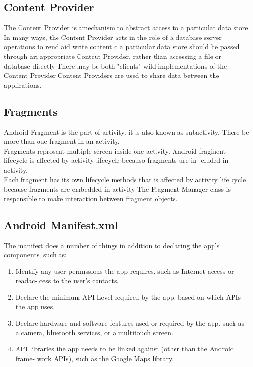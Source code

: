 \documentclass[twoside,a4paper,16pt]{book}
\begin{document}
\begin{itemize}
\begin{enumerate}
\subsection{Content Provider}
The Content Provider is amechanism to abstract access to a particular data store In many ways, the Content Provider acts in the role of a database server operations to rend aid write content o a particular data store should be passed through ari appropriate Contcut Provider. rather tlian accessing a file or database directly There may be both "clients" wild implementations of the Content Provider Content Providers are used to share data between the applications.\\

\subsection{Fragments}
Android Fragment is the part of artivity, it is also known as subactivity. There be more than oue fragment in an activity.\\ Fragments reprosent multiple screen inside one activity. Android fraginent lifecycle is affected by activity lifecycle becauso fragments ure in- cluded in activity.\\ Each fragment has its own lifecycle methods that is affected bv activity life cycle because fragments are embedded in activity The Fragment Manager class is responsible to make interaction between fragment objects.\\

\subsection{Android Manifest.xml}
The manifest does a number of things in addition to declaring the app's components. such as:\\
\begin{enumerate}
\item{Identify any user permissions the app requires, such as Internet access or readac- cess to the user's contacts.}
\item{ Declare the minimum API Level required by the app, based on which APIs the app uses.}
\item{ Declare hardware and software features used or required by the app. such as a camera, bluetooth services, or a multitouch screen.}
\item{ API libraries the app needs to be linked against (other than the Android frame- work APIs), such as the Google Maps library.}\\


\end{enumerate}
\end{enumerate}
\end{itemize}
\end{document}

